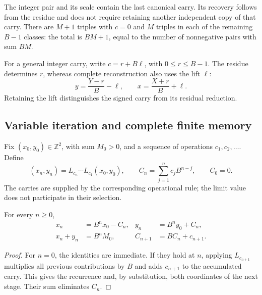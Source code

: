 The integer pair and its scale contain the last canonical carry. Its
recovery follows from the residue and does not require retaining another
independent copy of that carry. There are \(M+1\) triples with \(c=0\) and
\(M\) triples in each of the remaining \(B-1\) classes: the total
is \(BM+1\), equal to the number of nonnegative pairs with sum \(BM\).

For a general integer carry, write
\(c=r+B\ell\), with \(0\leq r\leq B-1\). The residue determines
\(r\), whereas complete reconstruction also uses the
lift \(\ell\):
\begin{equation}
 y=\frac{Y-r}{B}-\ell,\qquad
 x=\frac{X+r}{B}+\ell.
 \label{lib03:elevacion}
\end{equation}
Retaining the lift distinguishes the signed carry from its
residual reduction.

\subsection{Variable iteration and complete finite memory}
\label{lib03:memoria}

Fix \((x_0,y_0)\in\mathbb Z^2\), with sum \(M_0>0\), and a
sequence of operations \(c_1,c_2,\ldots\). Define
\begin{equation}
 (x_n,y_n)=L_{c_n}\cdots L_{c_1}(x_0,y_0),\qquad
 C_n=\sum_{j=1}^n c_jB^{n-j},\qquad C_0=0.
 \label{lib03:registro-acumulado}
\end{equation}
The carries are supplied by the corresponding operational rule; the
limit value does not participate in their selection.

\begin{theorem}
\label{lib03:teo-acumulacion}
For every \(n\geq0\),
\begin{equation}
 \begin{aligned}
 x_n&=B^nx_0-C_n,& y_n&=B^ny_0+C_n,\\
 x_n+y_n&=B^nM_0,& C_{n+1}&=BC_n+c_{n+1}.
 \end{aligned}
 \label{lib03:iteracion-exacta}
\end{equation}
\end{theorem}

\begin{proof}
For \(n=0\), the identities are immediate. If they hold at
\(n\), applying \(L_{c_{n+1}}\) multiplies all
previous contributions by \(B\) and adds \(c_{n+1}\) to the accumulated carry.
This gives the recurrence and, by substitution, both coordinates of the
next stage. Their sum eliminates \(C_n\).
\end{proof}

